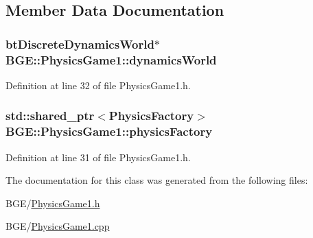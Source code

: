 \subsection{Member Data Documentation}
\hypertarget{class_b_g_e_1_1_physics_game1_a619e4ce5159417c88e112f224a6bce13}{
\subsubsection[{dynamics\-World}]{\setlength{\rightskip}{0pt plus 5cm}bt\-Discrete\-Dynamics\-World$\ast$ B\-G\-E\-::\-Physics\-Game1\-::dynamics\-World}}\label{class_b_g_e_1_1_physics_game1_a619e4ce5159417c88e112f224a6bce13}


Definition at line 32 of file Physics\-Game1.\-h.

\hypertarget{class_b_g_e_1_1_physics_game1_a7c76051112cdab2e335c7a08e9c6a11c}{
\subsubsection[{physics\-Factory}]{\setlength{\rightskip}{0pt plus 5cm}std\-::shared\-\_\-ptr$<${\bf Physics\-Factory}$>$ B\-G\-E\-::\-Physics\-Game1\-::physics\-Factory}}\label{class_b_g_e_1_1_physics_game1_a7c76051112cdab2e335c7a08e9c6a11c}


Definition at line 31 of file Physics\-Game1.\-h.



The documentation for this class was generated from the following files\-:\begin{DoxyCompactItemize}
\item 
B\-G\-E/\hyperlink{_physics_game1_8h}{Physics\-Game1.\-h}\item 
B\-G\-E/\hyperlink{_physics_game1_8cpp}{Physics\-Game1.\-cpp}\end{DoxyCompactItemize}
